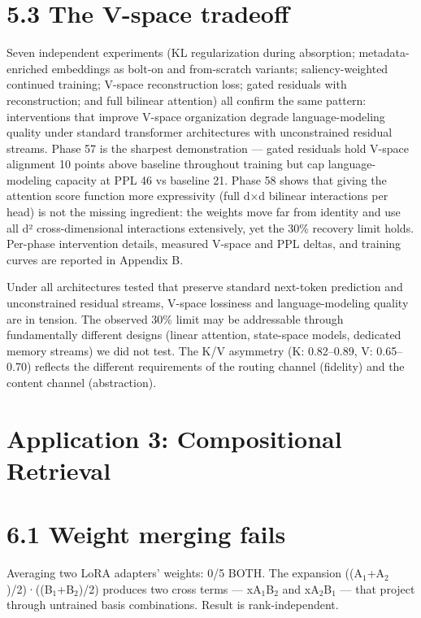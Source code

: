 \section{5.3 The V-space tradeoff}\label{the-v-space-tradeoff}

Seven independent experiments (KL regularization during absorption; metadata-enriched embeddings as bolt-on and from-scratch variants; saliency-weighted continued training; V-space reconstruction loss; gated residuals with reconstruction; and full bilinear attention) all confirm the same pattern: interventions that improve V-space organization degrade language-modeling quality under standard transformer architectures with unconstrained residual streams. Phase 57 is the sharpest demonstration --- gated residuals hold V-space alignment 10 points above baseline throughout training but cap language-modeling capacity at PPL 46 vs baseline 21. Phase 58 shows that giving the attention score function more expressivity (full d$\times$d bilinear interactions per head) is not the missing ingredient: the weights move far from identity and use all d² cross-dimensional interactions extensively, yet the 30\% recovery limit holds. Per-phase intervention details, measured V-space and PPL deltas, and training curves are reported in Appendix B.

Under all architectures tested that preserve standard next-token prediction and unconstrained residual streams, V-space lossiness and language-modeling quality are in tension. The observed 30\% limit may be addressable through fundamentally different designs (linear attention, state-space models, dedicated memory streams) we did not test. The K/V asymmetry (K: 0.82--0.89, V: 0.65--0.70) reflects the different requirements of the routing channel (fidelity) and the content channel (abstraction).

\section{Application 3: Compositional Retrieval}\label{application-3-compositional-retrieval}

\section{6.1 Weight merging fails}\label{weight-merging-fails}

Averaging two LoRA adapters' weights: 0/5 BOTH. The expansion ((A$_1$+A$_2$)/2)·((B$_1$+B$_2$)/2) produces two cross terms --- xA$_1$B$_2$ and xA$_2$B$_1$ --- that project through untrained basis combinations. Result is rank-independent.

